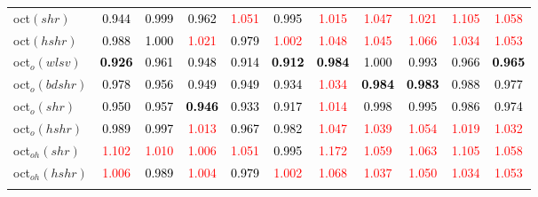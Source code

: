 \begin{tabular}[t]{l|>{}cccc>{}c|ccccc}
oct$(shr)$ & \textcolor{black}{0.944} & \textcolor{black}{0.999} & \textcolor{black}{0.962} & \textcolor{red}{1.051} & \textcolor{black}{0.995} & \textcolor{red}{1.015} & \textcolor{red}{1.047} & \textcolor{red}{1.021} & \textcolor{red}{1.105} & \textcolor{red}{1.058}\\
oct$(hshr)$ & \textcolor{black}{0.988} & \textcolor{black}{1.000} & \textcolor{red}{1.021} & \textcolor{black}{0.979} & \textcolor{red}{1.002} & \textcolor{red}{1.048} & \textcolor{red}{1.045} & \textcolor{red}{1.066} & \textcolor{red}{1.034} & \textcolor{red}{1.053}\\
oct$_o(wlsv)$ & \textcolor{black}{\textbf{0.926}} & \textcolor{black}{0.961} & \textcolor{black}{0.948} & \textcolor{black}{0.914} & \textcolor{black}{\textbf{0.912}} & \textcolor{black}{\textbf{0.984}} & \textcolor{black}{1.000} & \textcolor{black}{0.993} & \textcolor{black}{0.966} & \textcolor{black}{\textbf{0.965}}\\
oct$_o(bdshr)$ & \textcolor{black}{0.978} & \textcolor{black}{0.956} & \textcolor{black}{0.949} & \textcolor{black}{0.949} & \textcolor{black}{0.934} & \textcolor{red}{1.034} & \textcolor{black}{\textbf{0.984}} & \textcolor{black}{\textbf{0.983}} & \textcolor{black}{0.988} & \textcolor{black}{0.977}\\
oct$_o(shr)$ & \textcolor{black}{0.950} & \textcolor{black}{0.957} & \textcolor{black}{\textbf{0.946}} & \textcolor{black}{0.933} & \textcolor{black}{0.917} & \textcolor{red}{1.014} & \textcolor{black}{0.998} & \textcolor{black}{0.995} & \textcolor{black}{0.986} & \textcolor{black}{0.974}\\
oct$_o(hshr)$ & \textcolor{black}{0.989} & \textcolor{black}{0.997} & \textcolor{red}{1.013} & \textcolor{black}{0.967} & \textcolor{black}{0.982} & \textcolor{red}{1.047} & \textcolor{red}{1.039} & \textcolor{red}{1.054} & \textcolor{red}{1.019} & \textcolor{red}{1.032}\\
oct$_{oh}(shr)$ & \textcolor{red}{1.102} & \textcolor{red}{1.010} & \textcolor{red}{1.006} & \textcolor{red}{1.051} & \textcolor{black}{0.995} & \textcolor{red}{1.172} & \textcolor{red}{1.059} & \textcolor{red}{1.063} & \textcolor{red}{1.105} & \textcolor{red}{1.058}\\
oct$_{oh}(hshr)$ & \textcolor{red}{1.006} & \textcolor{black}{0.989} & \textcolor{red}{1.004} & \textcolor{black}{0.979} & \textcolor{red}{1.002} & \textcolor{red}{1.068} & \textcolor{red}{1.037} & \textcolor{red}{1.050} & \textcolor{red}{1.034} & \textcolor{red}{1.053}\\
\addlinespace[0.3em]

\end{tabular}
